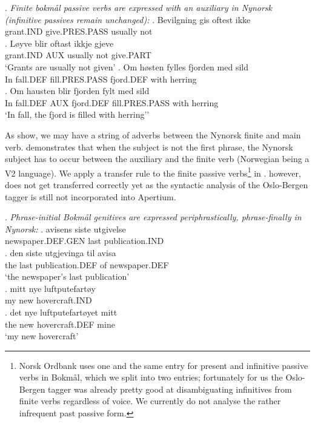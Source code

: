 \documentclass[11pt]{article}
\begin{document}
\setlength{\Exlabelsep}{1.1em} %
\alignSubExtrue %
\ex. \label{pass} \emph{Finite bokmål passive verbs are expressed with an auxiliary
  in Nynorsk (infinitive passives remain unchanged):}
\ag. Bevilgning gis oftest ikke\\
grant.IND give.PRES.PASS usually not\\
\bg. Løyve blir oftast ikkje gjeve\\
grant.IND AUX usually not give.PART \\
`Grants are usually not given'
\cg. \label{pass-c} Om høsten fylles fjorden med sild\\
In fall.DEF fill.PRES.PASS fjord.DEF with herring\\
\dg. Om hausten blir fjorden fylt med sild\\
In fall.DEF AUX fjord.DEF fill.PRES.PASS with herring\\ 
`In fall, the fjord is filled with herring''

As \Last[a-b] show, we may have a string of adverbs between the
Nynorsk finite and main verb. \Last[c-d] demonstrates that when the
subject is not the first phrase, the Nynorsk subject has to occur
between the auxiliary and the finite verb (Norwegian being a V2
language). We apply a transfer rule to the finite passive
verbs\footnote{Norsk Ordbank uses
  one and the same entry for present and infinitive passive verbs in
  Bokmål, which we split into two entries; fortunately for us the
  Oslo-Bergen tagger was already pretty good at disambiguating
  infinitives from finite verbs regardless of voice. We currently
  do not analyse the
  rather infrequent past passive form.} in \Last[a-b]. \Last[c-d]
however, does not get transferred correctly yet as the syntactic
analysis of the Oslo-Bergen tagger is still not incorporated into
Apertium.

\ex. \label{posgen} \emph{Phrase-initial Bokmål genitives are expressed
  periphrastically, phrase-finally in Nynorsk:}
\ag. avisens siste utgivelse\\
newspaper.DEF.GEN last publication.IND\\
\bg. den siste utgjevinga til avisa\\
the last publication.DEF of newspaper.DEF\\
`the newspaper's last publication'\\
\cg. mitt nye luftputefartøy\\
my new hovercraft.IND\\
\dg. det nye luftputefartøyet mitt\\
the new hovercraft.DEF mine\\
`my new hovercraft'
\end{document}
